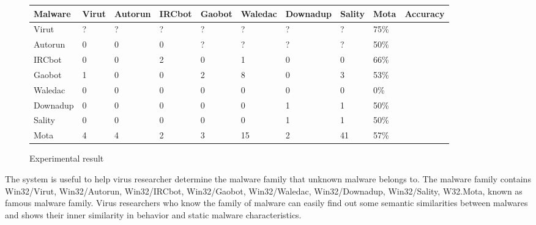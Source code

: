 \begin{figure}[h!]
  \begin{center}
    \begin{tabular}{ | l | l | l | l | l | l | l | l | l | l |}
     \hline
    Malware & Virut & Autorun & IRCbot & Gaobot & Waledac & Downadup & Sality & Mota & Accuracy\\ \hline
    Virut & ? & ? & ? & ? & ? & ? & ? & 75\% \\ \hline
	Autorun & 0 & 0 & 0 & ? & ? & ? & ? & 50\% \\ \hline
	IRCbot & 0 & 0 & 2 & 0 & 1 & 0 & 0 & 66\% \\ \hline
	Gaobot & 1 & 0 & 0 & 2 & 8 & 0 & 3 & 53\% \\ \hline
	Waledac & 0 & 0 & 0 & 0 & 0 & 0 & 0 & 0\% \\ \hline
	Downadup & 0 & 0 & 0 & 0 & 0 & 1 & 1 & 50\% \\ \hline
	Sality & 0 & 0 & 0 & 0 & 0 & 1 & 1 & 50\% \\ \hline
	Mota & 4 & 4 & 2 & 3 & 15 & 2 & 41 & 57\% \\ \hline

    \end{tabular}
	\end{center}
     \caption{Experimental result}
    \label{fig:experimentalresult}
\end{figure} 

The system is useful to help virus researcher determine the malware family that unknown malware belongs to. The malware family contains Win32/Virut, Win32/Autorun, Win32/IRCbot, Win32/Gaobot, Win32/Waledac, Win32/Downadup, Win32/Sality, W32.Mota, known as famous malware family. Virus researchers who know the family of malware can easily find out some semantic similarities between malwares and shows their inner similarity in behavior and static malware characteristics.

